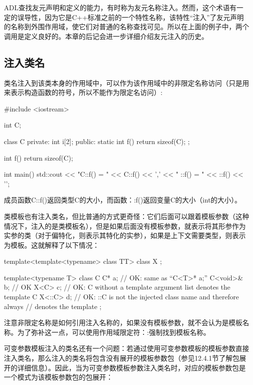 ADL查找友元声明和定义的能力，有时称为友元名称注入。然而，这个术语有一定的误导性，因为它是C++标准之前的一个特性名称，该特性“注入”了友元声明的名称到外围作用域，使它们对普通的名称查找可见。所以在上面的例子中，两个调用是定义良好的。本章的后记会进一步详细介绍友元注入的历史。

\subsection{注入类名}

类名注入到该类本身的作用域中，可以作为该作用域中的非限定名称访问（只是用来表示构造函数的符号，所以不能作为限定名访问）:

\begin{cpp}
#include <iostream>

int C;

class C {
private:
	int i[2];
public:
	static int f() {
		return sizeof(C);
	}
};

int f()
{
	return sizeof(C);
}

int main()
{
	std::cout << "C::f() = " << C::f() << ','
	<< " ::f() = " << ::f() << '\n';
}
\end{cpp}

成员函数C::f()返回类型C的大小，而函数：:f()返回变量C的大小（int的大小）。

类模板也有注入类名，但比普通的方式更奇怪：它们后面可以跟着模板参数（这种情况下，注入的是类模板名），但是如果后面没有模板参数，就表示将其形参作为实参的类（对于偏特化，则表示其特化的实参），如果是上下文需要类型，则表示为模板。这就解释了以下情况：

\begin{cpp}
template<template<typename> class TT> class X {
};

template<typename T> class C {
	C* a; // OK: same as “C<T>* a;”
	C<void>& b; // OK
	X<C> c; // OK: C without a template argument list denotes the template C
	X<::C> d; // OK: ::C is not the injected class name and therefore always
			  // denotes the template
};
\end{cpp}

注意非限定名称是如何引用注入名称的，如果没有模板参数，就不会认为是模板名称。为了弥补这一点，可以使用作用域限定符：:强制找到模板名称。

可变参数模板注入的类名还有一个问题：若通过使用可变参数模板的模板参数直接注入类名，那么注入的类名将包含没有展开的模板参数包（参见12.4.1节了解包展开的详细信息）。因此，当为可变参数模板参数注入类名时，对应的模板参数包是一个模式为该模板参数包的包展开：

